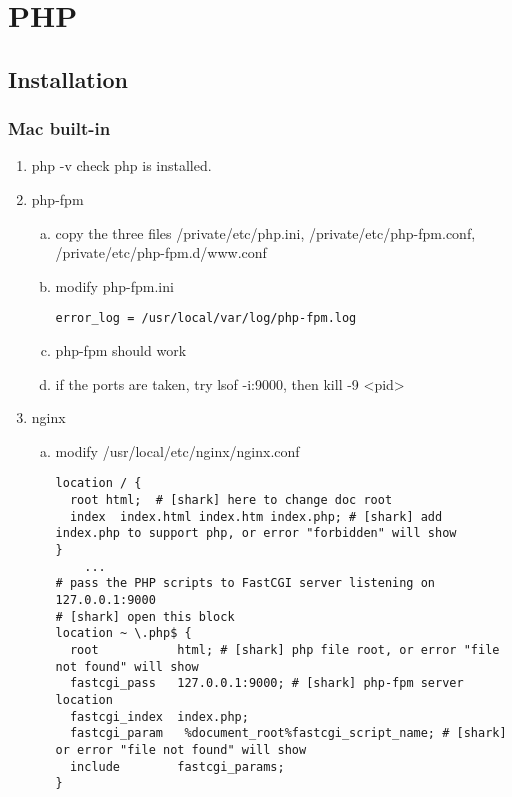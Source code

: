 \newpage
\section{PHP}
    \subsection{Installation}
        \subsubsection{Mac built-in}
        \begin{enumerate}[(1)]
            \item \colorbox{gray!30}{php -v} check php is installed.
            \item php-fpm
                \begin{enumerate}[(a)]
                    \item copy the three files \colorbox{gray!30}{/private/etc/php.ini}, \colorbox{gray!30}{/private/etc/php-fpm.conf}, \\ \colorbox{gray!30}{/private/etc/php-fpm.d/www.conf}
                    \item modify php-fpm.ini
                    \begin{lstlisting}
error_log = /usr/local/var/log/php-fpm.log
                    \end{lstlisting}
                    \item \colorbox{gray!30}{php-fpm} should work
                    \item if the ports are taken, try \colorbox{gray!30}{lsof -i:9000}, then \colorbox{gray!30}{kill -9 <pid>}
                \end{enumerate}
            \item nginx 
                \begin{enumerate}[(a)]
                    \item modify \colorbox{gray!30}{/usr/local/etc/nginx/nginx.conf}
                    \begin{lstlisting}
location / {
  root html;  # [shark] here to change doc root
  index  index.html index.htm index.php; # [shark] add index.php to support php, or error "forbidden" will show 
}
    ...
# pass the PHP scripts to FastCGI server listening on 127.0.0.1:9000
# [shark] open this block
location ~ \.php$ {
  root           html; # [shark] php file root, or error "file not found" will show
  fastcgi_pass   127.0.0.1:9000; # [shark] php-fpm server location
  fastcgi_index  index.php;
  fastcgi_param   %document_root%fastcgi_script_name; # [shark] or error "file not found" will show
  include        fastcgi_params;
}
                    \end{lstlisting}
                \end{enumerate}
        \end{enumerate}
        
